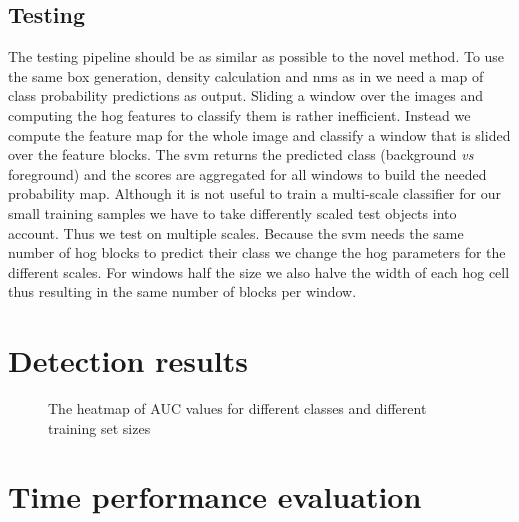 \subsection{Testing}
The testing pipeline should be as similar as possible to the novel method. To use the same box generation, density calculation and \gls{nms} as in  we need a map of class probability predictions as output. Sliding a window over the images and computing the \gls{hog} features to classify them is rather inefficient. Instead we compute the feature map for the whole image and classify a window that is slided over the feature blocks. The \gls{svm} returns the predicted class (background \textit{vs} foreground) and the scores are aggregated for all windows to build the needed probability map. Although it is not useful to train a multi-scale classifier for our small training samples we have to take differently scaled test objects into account. Thus we test on multiple scales. Because the \gls{svm} needs the same number of \gls{hog} blocks to predict their class we change the \gls{hog} parameters for the different scales. For windows half the size we also halve the width of each \gls{hog} cell thus resulting in the same number of blocks per window.


\section{Detection results}
\label{sec:results:results}
\blindtext[2]
\begin{figure}[p!]
    \centering
    
	\caption{The heatmap of AUC values for different classes and different training set sizes}
    \label{fig:auc_heatmap}
\end{figure}
\blindtext[2]

\section{Time performance evaluation}
\label{sec:results:time}
\blindtext[3]
